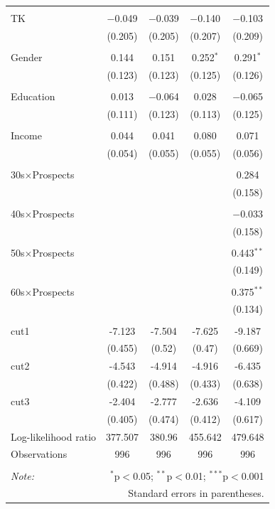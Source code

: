 \documentclass[letterpaper,9pt,twocolumn,twoside,]{pinp}
\begin{document}
\begin{table}[!htbp]
\begin{tabular}{@{\extracolsep{5pt}}lcccc}
  & & & & \\ 
 TK & $-$0.049 & $-$0.039 & $-$0.140 & $-$0.103 \\ 
  & (0.205) & (0.205) & (0.207) & (0.209) \\ 
  & & & & \\ 
 Gender & 0.144 & 0.151 & 0.252$^{*}$ & 0.291$^{*}$ \\ 
  & (0.123) & (0.123) & (0.125) & (0.126) \\ 
  & & & & \\ 
 Education & 0.013 & $-$0.064 & 0.028 & $-$0.065 \\ 
  & (0.111) & (0.123) & (0.113) & (0.125) \\ 
  & & & & \\ 
 Income & 0.044 & 0.041 & 0.080 & 0.071 \\ 
  & (0.054) & (0.055) & (0.055) & (0.056) \\ 
  & & & & \\ 
 30s$\times$Prospects &  &  &  & 0.284 \\ 
  &  &  &  & (0.158) \\ 
  & & & & \\ 
 40s$\times$Prospects &  &  &  & $-$0.033 \\ 
  &  &  &  & (0.158) \\ 
  & & & & \\ 
 50s$\times$Prospects &  &  &  & 0.443$^{**}$ \\ 
  &  &  &  & (0.149) \\ 
  & & & & \\ 
 60s$\times$Prospects &  &  &  & 0.375$^{**}$ \\ 
  &  &  &  & (0.134) \\ 
  & & & & \\ 
cut1 & -7.123 & -7.504 & -7.625 & -9.187 \\ 
 & (0.455) & (0.52) & (0.47) & (0.669) \\ 
cut2 & -4.543 & -4.914 & -4.916 & -6.435 \\ 
 & (0.422) & (0.488) & (0.433) & (0.638) \\ 
cut3 & -2.404 & -2.777 & -2.636 & -4.109 \\ 
 & (0.405) & (0.474) & (0.412) & (0.617) \\ 
Log-likelihood ratio & 377.507 & 380.96 & 455.642 & 479.648 \\ 
Observations & 996 & 996 & 996 & 996 \\ 
\hline \\[-1.8ex] 
\textit{Note:}  & \multicolumn{4}{r}{$^{*}$p$<$0.05; $^{**}$p$<$0.01; $^{***}$p$<$0.001} \\ 
 & \multicolumn{4}{r}{Standard errors in parentheses.} \\ 
\end{tabular} 
\end{table}
\end{document}
